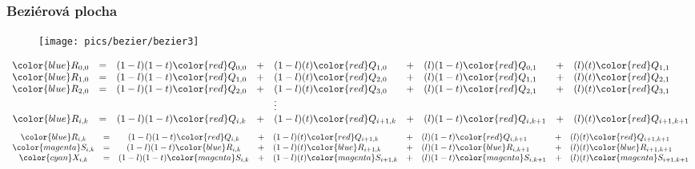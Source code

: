 \begin{frame}
\frametitle{Beziérová plocha}
  \begin{figure}[h]
  \texttt{[image: pics/bezier/bezier3]}
  \end{figure}
  {\tiny
  \[
  \begin{array}{ccclllllll}
    {\color{blue}R_{0,0}} &=& (1-l)(1-t){\color{red}Q_{0,0}} &+& (1-l)(t){\color{red}Q_{1,0}}   &+& (l)(1-t){\color{red}Q_{0,1}}   &+& (l)(t){\color{red}Q_{1,1}} \\
    {\color{blue}R_{1,0}} &=& (1-l)(1-t){\color{red}Q_{1,0}} &+& (1-l)(t){\color{red}Q_{2,0}}   &+& (l)(1-t){\color{red}Q_{1,1}}   &+& (l)(t){\color{red}Q_{2,1}} \\
    {\color{blue}R_{2,0}} &=& (1-l)(1-t){\color{red}Q_{2,0}} &+& (1-l)(t){\color{red}Q_{3,0}}   &+& (l)(1-t){\color{red}Q_{2,1}}   &+& (l)(t){\color{red}Q_{3,1}} \\
                         &&&&\vdots &&&& \\
    {\color{blue}R_{i,k}} &=& (1-l)(1-t){\color{red}Q_{i,k}} &+& (1-l)(t){\color{red}Q_{i+1,k}} &+& (l)(1-t){\color{red}Q_{i,k+1}} &+& (l)(t){\color{red}Q_{i+1,k+1}} \\
  \end{array}
  \]
  }
  {\tiny
  \[
  \begin{array}{ccclllllll}
    {\color{blue}R_{i,k}} &=& (1-l)(1-t){\color{red}Q_{i,k}} &+& (1-l)(t){\color{red}Q_{i+1,k}} &+& (l)(1-t){\color{red}Q_{i,k+1}} &+& (l)(t){\color{red}Q_{i+1,k+1}}        \\
    {\color{magenta}S_{i,k}} &=& (1-l)(1-t){\color{blue}R_{i,k}} &+& (1-l)(t){\color{blue}R_{i+1,k}} &+& (l)(1-t){\color{blue}R_{i,k+1}} &+& (l)(t){\color{blue}R_{i+1,k+1}} \\
    {\color{cyan}X_{i,k}} &=& (1-l)(1-t){\color{magenta}S_{i,k}} &+& (1-l)(t){\color{magenta}S_{i+1,k}} &+& (l)(1-t){\color{magenta}S_{i,k+1}} &+& (l)(t){\color{magenta}S_{i+1,k+1}}
  \end{array}
  \]
  }
\end{frame}


